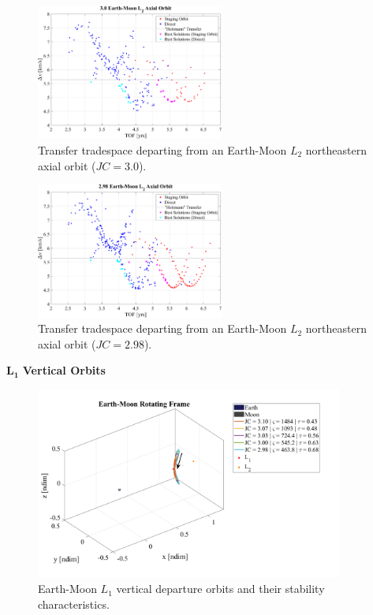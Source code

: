 \begin{figure}[ht]
    \centering
    \includegraphics[width=0.55\textwidth]{figures/TradeSpace_L2Axial_3_00.pdf}
    \caption{Transfer tradespace departing from an Earth-Moon $L_{2}$ northeastern axial orbit ($JC=3.0$).}
\end{figure}

\begin{figure}[ht]
    \centering
    \includegraphics[width=0.55\textwidth]{figures/TradeSpace_L2Axial_2_98.pdf}
    \caption{Transfer tradespace departing from an Earth-Moon $L_{2}$ northeastern axial orbit ($JC=2.98$).}
\end{figure}
\clearpage

$\pmb{L_{1}}$ \textbf{Vertical Orbits}
\begin{figure}[ht]
    \centering
    \includegraphics[width=0.9\textwidth]{figures/L1VerticalDepartureOrbits.pdf}
    \caption{Earth-Moon $L_{1}$ vertical departure orbits and their stability characteristics.}
\end{figure}
\clearpage

